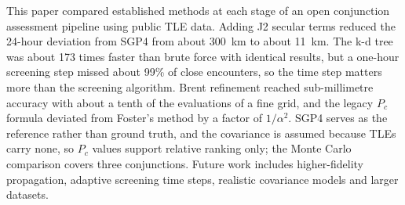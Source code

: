 \documentclass[runningheads]{llncs}
\begin{document}
This paper compared established methods at each stage of an open conjunction assessment pipeline using public TLE data. Adding J2 secular terms reduced the 24-hour deviation from SGP4 from about 300~km to about 11~km. The k-d tree was about 173 times faster than brute force with identical results, but a one-hour screening step missed about 99\% of close encounters, so the time step matters more than the screening algorithm. Brent refinement reached sub-millimetre accuracy with about a tenth of the evaluations of a fine grid, and the legacy $P_c$ formula deviated from Foster's method by a factor of $1/\alpha^2$. SGP4 serves as the reference rather than ground truth, and the covariance is assumed because TLEs carry none, so $P_c$ values support relative ranking only; the Monte Carlo comparison covers three conjunctions. Future work includes higher-fidelity propagation, adaptive screening time steps, realistic covariance models and larger datasets.
\end{document}
